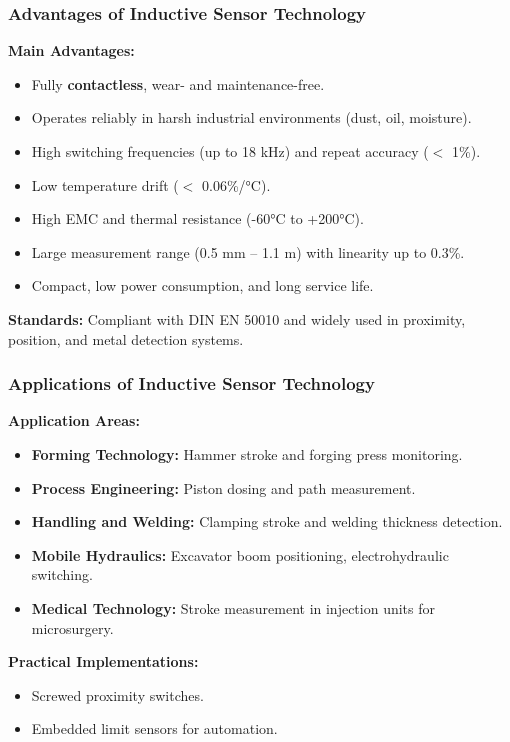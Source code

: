 \begin{frame}
	\frametitle{Advantages of Inductive Sensor Technology}
    \textbf{Main Advantages:}
    \begin{itemize}
        \item Fully \textbf{contactless}, wear- and maintenance-free.
        \item Operates reliably in harsh industrial environments (dust, oil, moisture).
        \item High switching frequencies (up to 18 kHz) and repeat accuracy ($<$ 1\%).
        \item Low temperature drift ($<$ 0.06\%/°C).
        \item High EMC and thermal resistance (-60°C to +200°C).
        \item Large measurement range (0.5 mm -- 1.1 m) with linearity up to 0.3\%.
        \item Compact, low power consumption, and long service life.
    \end{itemize}
    \medskip
    \textbf{Standards:}  
    Compliant with DIN EN 50010 and widely used in proximity, position, and metal detection systems.
\end{frame}

\begin{frame}
	\frametitle{Applications of Inductive Sensor Technology}
    \textbf{Application Areas:}
    \begin{itemize}
        \item \textbf{Forming Technology:} Hammer stroke and forging press monitoring.
        \item \textbf{Process Engineering:} Piston dosing and path measurement.
        \item \textbf{Handling and Welding:} Clamping stroke and welding thickness detection.
        \item \textbf{Mobile Hydraulics:} Excavator boom positioning, electrohydraulic switching.
        \item \textbf{Medical Technology:} Stroke measurement in injection units for microsurgery.
    \end{itemize}
    \textbf{Practical Implementations:}
    \begin{itemize}
        \item Screwed proximity switches.
        \item Embedded limit sensors for automation.
    \end{itemize}
\end{frame}

